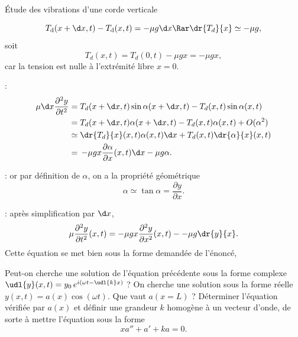 \begin{exo}[PC][3][TD]{Étude des vibrations d'une corde verticale}
\begin{quest}
{\begin{liste}
 $$T_{\rm{d}}(x+\d x,t) - T_{\rm{d}}(x,t)= -\mu g \d x \Rar \dr{T_d}{x} \simeq -\mu g,$$ soit 
 $$
T_d(x,t) =  T_d(0,t) -\mu g x = - \mu g x,
 $$
 car la tension est nulle à l'extrémité libre $x=0$.
  \item {} :%
 \begin{align*}
 \mu\d x\frac{\partial^2 y}{\partial t^2} & = T_d(x +\d x,t)\sin\alpha(x+\d x,t)- T_d(x,t)\sin\alpha(x,t) \\ & = T_d(x +\d x,t)\alpha(x+\d x,t)-T_d(x,t)\alpha(x,t) + O(\alpha^2) \\ & 
 \simeq \dr{T_d}{x}(x,t) \alpha(x,t)\d x + T_d(x,t)\dr{\alpha}{x}(x,t) 
 \\ & =\, -\mu g x \frac{\partial \alpha}{\partial x}(x,t)\d x -\mu g \alpha.
\end{align*}
\item {} :
or par définition de $\alpha$, on a la propriété géométrique
\begin{equation*}
 \alpha \simeq \tan\alpha = \frac{\partial y}{\partial x}.
\end{equation*}
\item {} : après simplification par $\d x$,
\begin{equation*}
  \mu\frac{\partial^2 y}{\partial t^2}(x,t) =-\mu g x \frac{\partial^2 y}{\partial x^2}(x,t) - -\mu g \dr{y}{x}.
\end{equation*}
Cette équation se met bien sous la forme demandée de l'énoncé,
\end{liste}
  }
  \item Peut-on cherche une solution de l'équation précédente sous la forme complexe $\udl{y}(x,t)=y_0 \, e^{i(\omega t - \udl{k}x)}$ ? On cherche une solution sous la forme réelle $y(x,t)=a(x)\cos(\omega t)$. Que vaut $a(x=L)$ ? Déterminer l'équation vérifiée par $a(x)$ et définir une grandeur $k$ homogène à un vecteur d'onde, de sorte à mettre l'équation sous la forme 
  \begin{equation}
    xa'' + a' + k a = 0.
  \end{equation}

\end{quest}
\end{exo}
